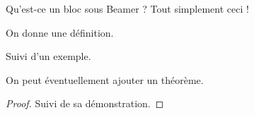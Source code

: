 


\begin{frame}
	\begin{block}{Qu'est-ce un bloc sous Beamer ?}
		Tout simplement ceci !
	\end{block}
	\begin{definition} %
		On donne une définition.
	\end{definition}

	\begin{example} %
		Suivi d'un exemple.
	\end{example}

	\begin{theorem} %
		On peut éventuellement ajouter un théorème.
	\end{theorem}

	\begin{proof} %
		Suivi de sa démonstration.
	\end{proof}
\end{frame}


